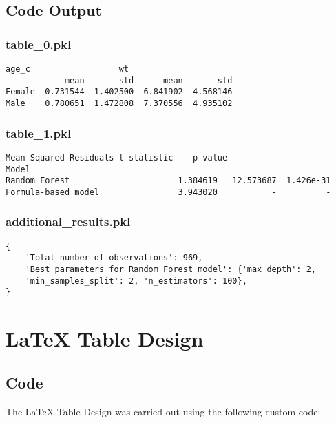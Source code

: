 \documentclass[11pt]{article}
\begin{document}
\subsection{Code Output}

\subsubsection*{table\_0.pkl}

\begin{Verbatim}[tabsize=4]
           age_c                  wt
            mean       std      mean       std
Female  0.731544  1.402500  6.841902  4.568146
Male    0.780651  1.472808  7.370556  4.935102
\end{Verbatim}

\subsubsection*{table\_1.pkl}

\begin{Verbatim}[tabsize=4]
                     Mean Squared Residuals t-statistic    p-value
Model
Random Forest                      1.384619   12.573687  1.426e-31
Formula-based model                3.943020           -          -
\end{Verbatim}

\subsubsection*{additional\_results.pkl}

\begin{Verbatim}[tabsize=4]
{
    'Total number of observations': 969,
    'Best parameters for Random Forest model': {'max_depth': 2,
	'min_samples_split': 2, 'n_estimators': 100},
}
\end{Verbatim}

\section{LaTeX Table Design}
\subsection{{Code}}
The LaTeX Table Design was carried out using the following custom code:
\end{document}
